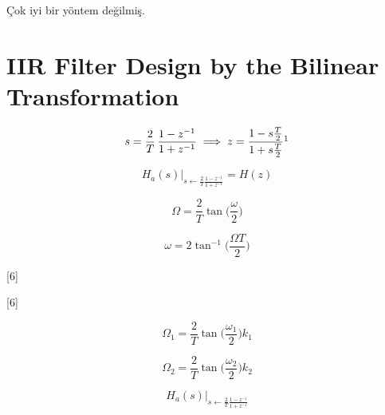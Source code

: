 \documentclass[11pt,a4paper]{article}
\begin{document}
Çok iyi bir yöntem değilmiş.

\section{IIR Filter Design by the Bilinear Transformation}

\[ s = \frac{2}{T}\,\frac{1 - z^{-1}}{1 + z^{-1}} \;\Longrightarrow\; z = \frac{1 - s\frac{T}{2}}{1 + s\frac{T}{2}}\footnotemark \]

\[ H_a(s)\Big|_{s \leftarrow \frac{2}{T}\frac{1-z^{-1}}{1+z^{-1}}} = H(z) \]

\[ \Omega = \frac{2}{T}\tan\Big(\frac{\omega}{2}\Big) \]

\[ \omega = 2\tan^{-1}\Big(\frac{\Omega T}{2}\Big) \]

[6]

[6]

\[ \Omega_1 = \frac{2}{T}\tan\Big(\frac{\omega_1}{2}\Big) k_1 \]

\[ \Omega_2 = \frac{2}{T}\tan\Big(\frac{\omega_2}{2}\Big) k_2 \]

\[ H_a(s)\Big|_{s \leftarrow \frac{2}{T}\frac{1-z^{-1}}{1+z^{-1}}} \]
\end{document}
